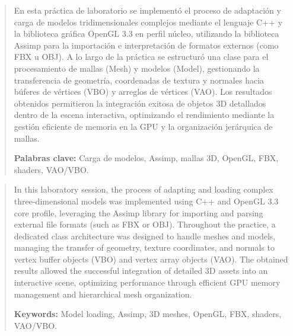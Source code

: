 
\begin{abstract}
En esta práctica de laboratorio se implementó el proceso de adaptación y carga de modelos tridimensionales complejos mediante el lenguaje C++ y la biblioteca gráfica OpenGL 3.3 en perfil núcleo, utilizando la biblioteca Assimp para la importación e interpretación de formatos externos (como FBX u OBJ). A lo largo de la práctica se estructuró una clase para el procesamiento de mallas (Mesh) y modelos (Model), gestionando la transferencia de geometría, coordenadas de textura y normales hacia búferes de vértices (VBO) y arreglos de vértices (VAO). Los resultados obtenidos permitieron la integración exitosa de objetos 3D detallados dentro de la escena interactiva, optimizando el rendimiento mediante la gestión eficiente de memoria en la GPU y la organización jerárquica de mallas.

\vspace{0.3cm}
\noindent\textbf{Palabras clave:} Carga de modelos, Assimp, mallas 3D, OpenGL, FBX, shaders, VAO/VBO.
\end{abstract}

\vspace{0.5cm}

\renewcommand{\abstractname}{Abstract}
\begin{abstract}
In this laboratory session, the process of adapting and loading complex three-dimensional models was implemented using C++ and OpenGL 3.3 core profile, leveraging the Assimp library for importing and parsing external file formats (such as FBX or OBJ). Throughout the practice, a dedicated class architecture was designed to handle meshes and models, managing the transfer of geometry, texture coordinates, and normals to vertex buffer objects (VBO) and vertex array objects (VAO). The obtained results allowed the successful integration of detailed 3D assets into an interactive scene, optimizing performance through efficient GPU memory management and hierarchical mesh organization.

\vspace{0.3cm}
\noindent\textbf{Keywords:} Model loading, Assimp, 3D meshes, OpenGL, FBX, shaders, VAO/VBO.
\end{abstract}

